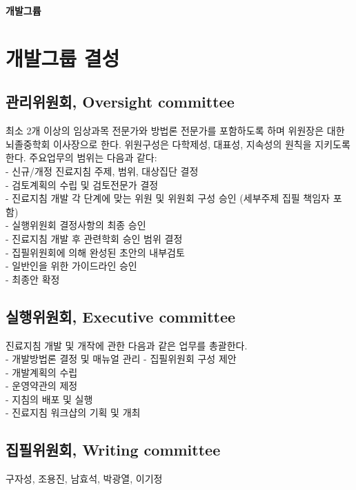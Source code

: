 \documentclass{paper}
\begin{document}
\Large \textbf{개발그륩} \normalsize

\section{개발그룹 결성}
\subsection{관리위원회, Oversight committee}
최소 2개 이상의 임상과목 전문가와 방법론 전문가를 포함하도록 하며 위원장은 대한뇌졸중학회 이사장으로 한다. 위원구성은 다학제성, 대표성, 지속성의 원칙을 지키도록 한다.
주요업무의 범위는 다음과 같다:\\[3ex]
- 신규/개정 진료지침 주제, 범위, 대상집단 결정\\
- 검토계획의 수립 및 검토전문가 결정\\
- 진료지침 개발 각 단계에 맞는 위원 및 위원회 구성 승인 (세부주제 집필 책임자 포함) \\
- 실행위원회 결정사항의 최종 승인\\
- 진료지침 개발 후 관련학회 승인 범위 결정\\
- 집필위원회에 의해 완성된 초안의 내부검토\\
- 일반인을 위한 가이드라인 승인\\
- 최종안 확정

\subsection{실행위원회, Executive committee}
진료지침 개발 및 개작에 관한 다음과 같은 업무를 총괄한다.\\[3ex]
- 개발방법론 결정 및 매뉴얼 관리 - 집필위원회 구성 제안\\
- 개발계획의 수립\\
- 운영약관의 제정\\
- 지침의 배포 및 실행\\
- 진료지침 워크샵의 기획 및 개최


\subsection{집필위원회, Writing committee}
구자성, 조용진, 남효석, 박광열, 이기정\\[3ex]
\end{document}
